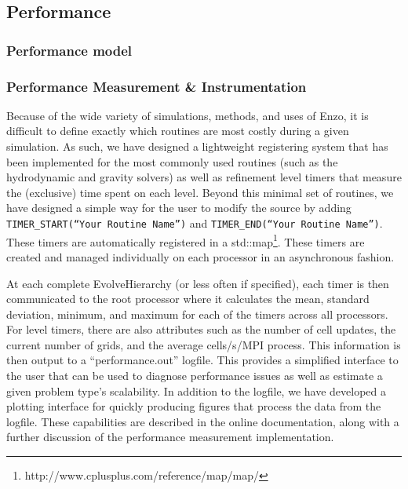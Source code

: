 
\subsection{Performance}
\label{sec.performance}

\subsubsection{Performance model }


\subsubsection{Performance Measurement \& Instrumentation }

Because of the wide variety of simulations, methods, and uses of Enzo,
it is difficult to define exactly which routines are most costly
during a given simulation.  As such, we have designed a lightweight
registering system that has been implemented for the most commonly
used routines (such as the hydrodynamic and gravity solvers) as well
as refinement level timers that measure the (exclusive) time spent on
each level.  Beyond this minimal set of routines, we have designed a
simple way for the user to modify the source by adding
\texttt{TIMER\_START(``Your Routine Name'')} and
\texttt{TIMER\_END(``Your Routine Name'')}.  These timers are
automatically registered in a
std::map\footnote{http://www.cplusplus.com/reference/map/map/}.  These
timers are created and managed individually on each processor in an
asynchronous fashion.

At each complete EvolveHierarchy (or less often if specified), each timer is
then communicated to the root processor where it calculates the mean, standard
deviation, minimum, and maximum for each of the timers across all processors. 
For level timers, there are also attributes such as the number of cell updates,
the current number of grids, and the average cells/s/MPI process.  This
information is then output to a ``performance.out'' logfile.  This provides a 
simplified interface to the user that can be used to diagnose performance 
issues as well as estimate a given problem type's scalability.  In addition to 
the logfile, we have developed a plotting interface for quickly producing 
figures that process the data from the logfile.  These capabilities are 
described in the online documentation, along with a further discussion of the 
performance measurement implementation.

